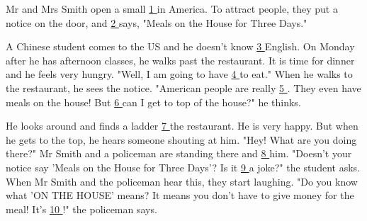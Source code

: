 \item{
    Mr and Mrs Smith open a small \underline{ 1 } in America. To attract people, they put a notice on the door, and \underline{ 2 } says, "Meals on the House for Three Days."

    \hspace{2em} 
    A Chinese student comes to the US and he doesn't know \underline{ 3 } English. On Monday after he has afternoon classes, he walks past the restaurant. It is time for dinner and he feels very hungry. "Well, I am going to have \underline{ 4 } to eat." When he walks to the restaurant, he sees the notice. "American people are really \underline{ 5 }. They even have meals on the house! But \underline{ 6 } can I get to top of the house?" he thinks.

    \hspace{2em} 
    He looks around and finds a ladder \underline{ 7 } the restaurant. He is very happy. But when he gets to the top, he hears someone shouting at him. "Hey! What are you doing there?" Mr Smith and a policeman are standing there and \underline{ 8 } him. "Doesn't your notice say 'Meals on the House for Three Days'? Is it \underline{ 9 } a joke?" the student asks. When Mr Smith and the policeman hear this, they start laughing. "Do you know what 'ON THE HOUSE' means? It means you don't have to give money for the meal! It's \underline{ 10 }!" the policeman says.

}
